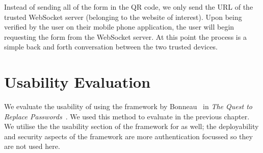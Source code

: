 Instead of sending all of the form in the QR code, we only send the URL of the trusted WebSocket server (belonging to the website of interest). Upon being verified by the user on their \deeid mobile phone application, the user will begin requesting the form from the WebSocket server. At this point the process is a simple back and forth conversation between the two trusted devices.

\section{Usability Evaluation}

We evaluate the usability of \formless using the framework by Bonneau \etal\ in \textit{The Quest to Replace Passwords}~\cite{bonneau_quest_2012}. We used this method to evaluate \deeid in the previous chapter. We utilise the the usability section of the framework for \formless as well; the deployability and security aspects of the framework are more authentication focussed so they are not used here.

